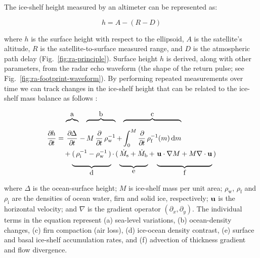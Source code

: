 \newpage

The ice-shelf height measured by an altimeter can be represented as:

\begin{equation}
  h = A - (R - D)
\end{equation}
\label{eq:ra-height}

\noindent
where $h$ is the surface height with respect to the ellipsoid, $A$ is the satellite's altitude, $R$ is the satellite-to-surface measured range, and $D$ is the atmospheric path delay (Fig.~\ref{fig:ra-principle}). Surface height $h$ is derived, along with other parameters, from the radar echo waveform (the shape of the return pulse; see Fig.~\ref{fig:ra-footprint-waveform}). By performing repeated measurements over time we can track changes in the ice-shelf height that can be related to the ice-shelf mass balance as follows \parencite{Shepherd2004a, Padman2012}:

\begin{equation}
\begin{split}
  \frac{\del h}{\del t} &= 
    \overbrace{
      \frac{\del \Delta}{\del t}
      \rule[20pt]{0pt}{5pt}}^{\mbox{a}}
    -\overbrace{
      M \, \frac{\del}{\del t} \, \rho^{-1}_\text{w}
      \rule[20pt]{0pt}{5pt}}^{\mbox{b}}
    +\overbrace{
      \int^M_0 \frac{\del}{\del t} \, \rho^{-1}_\text{f}(m) \, \text{d}m 
      \rule[20pt]{0pt}{5pt}}^{\mbox{c}} \\
    &\quad +\underbrace{
      ( \, \rho^{-1}_\text{i} - \rho^{-1}_\text{w} \, ) 
      \rule[-11pt]{0pt}{5pt}}_{\mbox{d}}
    \cdot \, ( \, 
      \underbrace{ \dot{M}_\text{s} + \dot{M}_\text{b}
      \rule[-11pt]{0pt}{5pt}}_{\mbox{e}}
      + \, 
      \underbrace{ \vect{u} \cdot \nabla M + M \nabla \cdot \vect{u} 
      \rule[-11pt]{0pt}{5pt}}_{\mbox{f}}
    \, )
\end{split}
\end{equation}
\label{eq:ra-height-change}

\noindent
where $\Delta$ is the ocean-surface height; $M$ is ice-shelf mass per unit area; $\rho_\text{w}$, $\rho_\text{f}$ and $\rho_\text{i}$ are the densities of ocean water, firn and solid ice, respectively; $\mathbf{u}$ is the horizontal velocity; and $\nabla$ is the gradient operator $(\partial_x, \partial_y)$. The individual terms in the equation represent (a) sea-level variations, (b) ocean-density changes, (c) firn compaction (air loss), (d) ice-ocean density contrast, (e) surface and basal ice-shelf accumulation rates, and (f) advection of thickness gradient and flow divergence.

